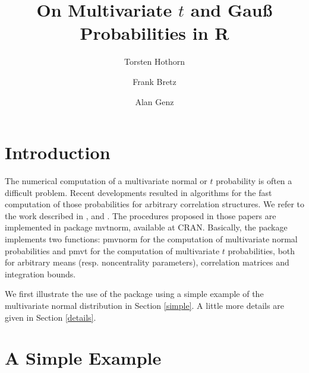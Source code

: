 \documentclass[11pt]{amsart}
\begin{document}
\title{On Multivariate $t$ and Gau{\ss} Probabilities in R}

\author{Torsten Hothorn}
\address{Friedrich-Alexander-Universit\"at Erlangen-N\"urnberg \\
Institut f\"ur Medizininformatik, Biometrie und Epidemiologie \\
Waldstra{\ss}e 6, D-91054 Erlangen}
\author{Frank Bretz}
\address{Universit\"at Hannover \\ LG Bioinformatik, FB Gartenbau \\
Herrenh\"auser Str. 2 \\ D-30419 Hannover}
\author{Alan Genz}
\address{Department of Mathematics \\ Washington State University \\
Pullman, WA 99164-3113 USA}

\maketitle

\section*{Introduction}

The numerical computation of a multivariate normal or $t$ probability is
often a difficult problem. Recent developments resulted in algorithms for
the fast computation of those probabilities for arbitrary correlation
structures. We refer to the work described in \cite{numerical-:1992},
\cite{comparison:1993} and \cite{numerical-:1999}. The procedures proposed
in those papers are implemented in package {\ttfamily mvtnorm}, available at
CRAN. Basically, the package implements two functions: {\ttfamily pmvnorm}
for the computation of multivariate normal probabilities and {\ttfamily
pmvt} for the computation of multivariate $t$ probabilities, both for
arbitrary means (resp. noncentrality parameters), correlation matrices
and integration bounds.

We first illustrate the use of the package using a simple example of the
multivariate normal distribution in Section \ref{simple}. 
A little more details are given in Section \ref{details}. 

\section{A Simple Example \label{simple}}
\end{document}
